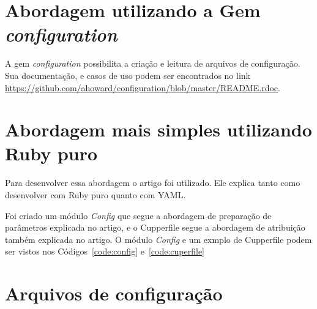 \section{Abordagem utilizando a Gem \textit{configuration}}
A gem \textit{configuration} possibilita a criação e leitura de arquivos de 
configuração. Sua documentação, e casos de uso podem ser encontrados no link
\url{https://github.com/ahoward/configuration/blob/master/README.rdoc}.

\section{Abordagem mais simples utilizando Ruby puro}
Para desenvolver essa abordagem o artigo \cite{config-file:2011} foi utilizado. Ele
explica tanto como desenvolver com Ruby puro quanto com YAML.

Foi criado um módulo \textit{Config} que segue a abordagem de preparação de
parâmetros explicada no artigo, e o Cupperfile segue a abordagem de atribuição
também explicada no artigo. O módulo \textit{Config} e um exmplo de Cupperfile
podem ser vistos nos Códigos~\ref{code:config} e~\ref{code:cuperfile}


\noindent\begin{minipage}{\textwidth}
  \lstset{style=shell}
  
\end{minipage}\hfill

\noindent\begin{minipage}{\textwidth}
  \lstset{style=shell}
  
\end{minipage}\hfill

\section{Arquivos de configuração}

\noindent\begin{minipage}{\textwidth}
  \lstset{style=shell}
  
\end{minipage}\hfill

\noindent\begin{minipage}{\textwidth}
  \lstset{style=shell}
  
\end{minipage}\hfill
